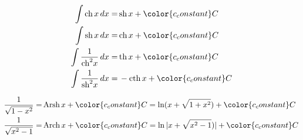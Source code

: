 \begin{center}
\begin{multicols}{2}
    \begin{align*}
        \int \text{ch}\, x\,dx =&\,\text{sh}\, x + {\color{c_constant}C}\\
        \int \text{sh}\, x\,dx =&\,\text{ch}\, x + {\color{c_constant}C}\\
        \int \frac{1}{\text{ch}^2 x}\,dx =&\,\text{th}\, x + {\color{c_constant}C}\\
        \int \frac{1}{\text{sh}^2 x}\,dx =&\,-\text{cth}\, x + {\color{c_constant}C}
    \end{align*}

    \columnbreak

    \begin{align*}
        \frac{1}{\sqrt{1 - x^2}}=&\,\text{Arsh}\, x  + {\color{c_constant}C} = \ln (x+\sqrt{1+x^2}) + {\color{c_constant}C}\\
        \frac{1}{\sqrt{x^2 - 1}}=&\,\text{Arch}\, x  + {\color{c_constant}C} = \ln |x+\sqrt{x^2-1})| + {\color{c_constant}C}
    \end{align*}
\end{multicols}


\end{center}
